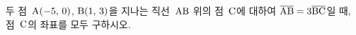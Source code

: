 두 점~$\mathrm{A}(-5,\,0)$, $\mathrm{B}(1,\,3)$을 지나는 직선~$\mathrm{AB}$ 위의 점~$\mathrm{C}$에 대하여 $\overline{\mathrm{AB}}=3\overline{\mathrm{BC}}$일 때, 점~$\mathrm{C}$의 좌표를 모두 구하시오.
